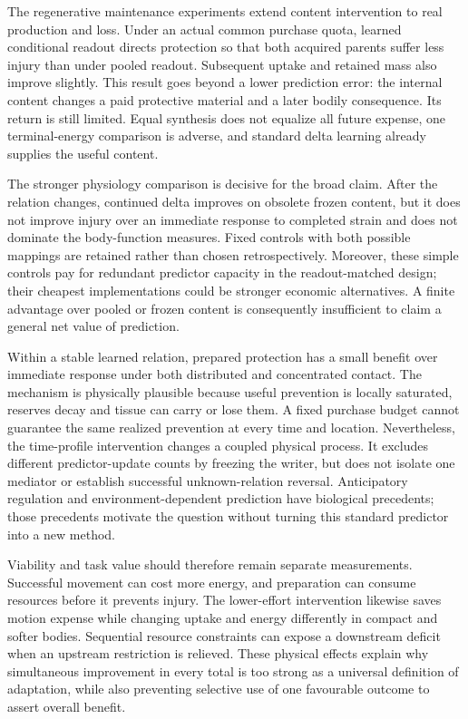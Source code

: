 The regenerative maintenance experiments extend content intervention to real production and loss. Under an actual common purchase quota, learned conditional readout directs protection so that both acquired parents suffer less injury than under pooled readout. Subsequent uptake and retained mass also improve slightly. This result goes beyond a lower prediction error: the internal content changes a paid protective material and a later bodily consequence. Its return is still limited. Equal synthesis does not equalize all future expense, one terminal-energy comparison is adverse, and standard delta learning already supplies the useful content.

The stronger physiology comparison is decisive for the broad claim. After the relation changes, continued delta improves on obsolete frozen content, but it does not improve injury over an immediate response to completed strain and does not dominate the body-function measures. Fixed controls with both possible mappings are retained rather than chosen retrospectively. Moreover, these simple controls pay for redundant predictor capacity in the readout-matched design; their cheapest implementations could be stronger economic alternatives. A finite advantage over pooled or frozen content is consequently insufficient to claim a general net value of prediction.

Within a stable learned relation, prepared protection has a small benefit over immediate response under both distributed and concentrated contact. The mechanism is physically plausible because useful prevention is locally saturated, reserves decay and tissue can carry or lose them. A fixed purchase budget cannot guarantee the same realized prevention at every time and location. Nevertheless, the time-profile intervention changes a coupled physical process. It excludes different predictor-update counts by freezing the writer, but does not isolate one mediator or establish successful unknown-relation reversal. Anticipatory regulation and environment-dependent prediction have biological precedents\cite{mitchell,tagkopoulos,lambert}; those precedents motivate the question without turning this standard predictor into a new method.

Viability and task value should therefore remain separate measurements. Successful movement can cost more energy, and preparation can consume resources before it prevents injury. The lower-effort intervention likewise saves motion expense while changing uptake and energy differently in compact and softer bodies. Sequential resource constraints can expose a downstream deficit when an upstream restriction is relieved. These physical effects explain why simultaneous improvement in every total is too strong as a universal definition of adaptation, while also preventing selective use of one favourable outcome to assert overall benefit.

